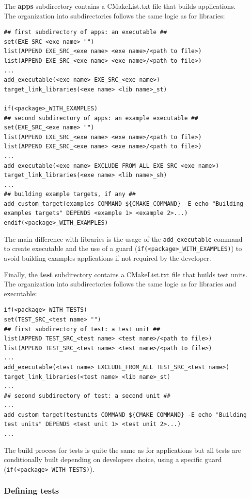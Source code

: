 \documentclass[12pt,a4paper]{article}
\begin{document}
The \textbf{apps} subdirectory contains a CMakeList.txt file that builds applications. The organization into subdirectories follows the same logic as for libraries:
\begin{verbatim}
## first subdirectory of apps: an executable ##
set(EXE_SRC_<exe name> "")
list(APPEND EXE_SRC_<exe name> <exe name>/<path to file>)
list(APPEND EXE_SRC_<exe name> <exe name>/<path to file>)
...
add_executable(<exe name> EXE_SRC_<exe name>)
target_link_libraries(<exe name> <lib name>_st)

if(<package>_WITH_EXAMPLES)
## second subdirectory of apps: an example executable ##
set(EXE_SRC_<exe name> "")
list(APPEND EXE_SRC_<exe name> <exe name>/<path to file>)
list(APPEND EXE_SRC_<exe name> <exe name>/<path to file>)
...
add_executable(<exe name> EXCLUDE_FROM_ALL EXE_SRC_<exe name>)
target_link_libraries(<exe name> <lib name>_sh)
...
## building example targets, if any ##
add_custom_target(examples COMMAND ${CMAKE_COMMAND} -E echo "Building 
examples targets" DEPENDS <example 1> <example 2>...)
endif(<package>_WITH_EXAMPLES)

\end{verbatim}
The main difference with libraries is the usage of the \verb|add_executable| command to create executable and the use of a guard (\verb|if(<package>_WITH_EXAMPLES)|) to avoid building examples applications if not required by the developer.

Finally, the \textbf{test} subdirectory contains a CMakeList.txt file that builds test units. The organization into subdirectories follows the same logic as for libraries and executable:
\begin{verbatim}
if(<package>_WITH_TESTS)
set(TEST_SRC_<test name> "")
## first subdirectory of test: a test unit ##
list(APPEND TEST_SRC_<test name> <test name>/<path to file>)
list(APPEND TEST_SRC_<test name> <test name>/<path to file>)
...
add_executable(<test name> EXCLUDE_FROM_ALL TEST_SRC_<test name>)
target_link_libraries(<test name> <lib name>_st)
...
## second subdirectory of test: a second unit ##
...
add_custom_target(testunits COMMAND ${CMAKE_COMMAND} -E echo "Building 
test units" DEPENDS <test unit 1> <test unit 2>...)
...
\end{verbatim}
The build process for tests is quite the same as for applications but all tests are conditionally built depending on developers choice, using a specific guard (\verb|if(<package>_WITH_TESTS)|). 


\subsubsection{Defining tests}
\end{document}
